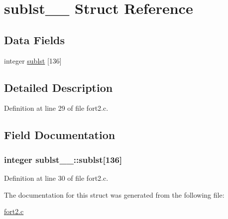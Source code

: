 \hypertarget{structsublst__1__}{}\section{sublst\+\_\+\_\+ Struct Reference}
\label{structsublst__1__}
\subsection*{Data Fields}
\begin{DoxyCompactItemize}
\item 
integer \hyperlink{structsublst__1___a6f84df4ed0e1686109309ab9a1231c91}{sublst} \mbox{[}136\mbox{]}
\end{DoxyCompactItemize}


\subsection{Detailed Description}


Definition at line 29 of file fort2.\+c.



\subsection{Field Documentation}
\subsubsection[{\texorpdfstring{sublst}{sublst}}]{\setlength{\rightskip}{0pt plus 5cm}integer sublst\+\_\+\_\+\+::sublst\mbox{[}136\mbox{]}}\hypertarget{structsublst__1___a6f84df4ed0e1686109309ab9a1231c91}{}\label{structsublst__1___a6f84df4ed0e1686109309ab9a1231c91}


Definition at line 30 of file fort2.\+c.



The documentation for this struct was generated from the following file\+:\begin{DoxyCompactItemize}
\item 
\hyperlink{fort2_8c}{fort2.\+c}\end{DoxyCompactItemize}

